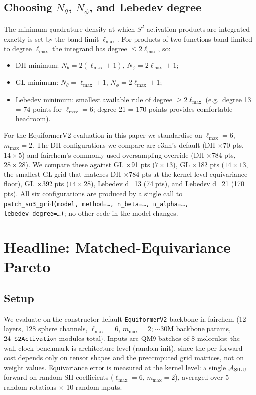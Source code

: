 \documentclass{article}
\begin{document}
\subsection{Choosing $N_\theta$, $N_\phi$, and Lebedev degree}

The minimum quadrature density at which $S^2$ activation products are
integrated exactly is set by the band limit $\ell_{\max}$. For
products of two functions band-limited to degree $\ell_{\max}$ the
integrand has degree $\leq 2\ell_{\max}$, so:
\begin{itemize}\setlength\itemsep{0pt}
\item DH minimum: $N_\theta = 2(\ell_{\max}+1)$, $N_\phi = 2\ell_{\max}+1$;
\item GL minimum: $N_\theta = \ell_{\max}+1$, $N_\phi = 2\ell_{\max}+1$;
\item Lebedev minimum: smallest available rule of degree
  $\geq 2\ell_{\max}$ (e.g.\ degree 13 = 74 points for
  $\ell_{\max}=6$; degree 21 = 170 points provides comfortable
  headroom).
\end{itemize}
For the EquiformerV2 evaluation in this paper we standardise on
$\ell_{\max} = 6$, $m_{\max} = 2$. The DH configurations we compare
are e3nn's default (DH ×70 pts, $14 \times 5$) and fairchem's
commonly used oversampling override (DH ×784 pts, $28 \times 28$).
We compare these against GL ×91 pts ($7 \times 13$), GL ×182 pts
($14 \times 13$, the smallest GL grid that matches DH ×784 pts at
the kernel-level equivariance floor), GL ×392 pts ($14 \times 28$),
Lebedev d=13 (74 pts), and Lebedev d=21 (170 pts). All six configurations
are produced by a single call to \texttt{patch\_so3\_grid(model,
method=\ldots, n\_beta=\ldots, n\_alpha=\ldots, lebedev\_degree=\ldots)};
no other code in the model changes.

\section{Headline: Matched-Equivariance Pareto}
\label{sec:headline}

\subsection{Setup}
We evaluate on the constructor-default \texttt{EquiformerV2} backbone
in fairchem (12 layers, 128 sphere channels,
$\ell_{\max}{=}6$, $m_{\max}{=}2$; $\sim$30M backbone params,
24~\texttt{S2Activation} modules total). Inputs are QM9 batches of
$8$ molecules; the wall-clock benchmark is architecture-level
(random-init), since the per-forward cost depends only on tensor
shapes and the precomputed grid matrices, not on weight values.
Equivariance error is measured at the kernel level: a single
$\mathcal{A}_{\rm SiLU}$ forward on random SH coefficients
($\ell_{\max}{=}6$, $m_{\max}{=}2$), averaged over 5 random rotations
$\times$ 10 random inputs.
\end{document}
